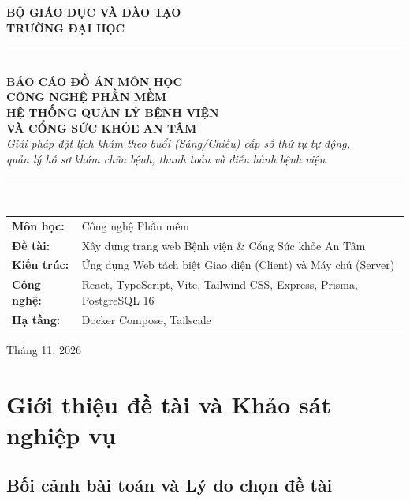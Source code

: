 \documentclass[12pt,a4paper]{report}
\begin{document}
\begin{titlepage}
  \centering
  \vspace*{0.8cm}
  {\large\bfseries BỘ GIÁO DỤC VÀ ĐÀO TẠO \\[4pt]
  TRƯỜNG ĐẠI HỌC \dotfill} \\[1.2cm]

  \rule{\textwidth}{1.5pt} \\[0.6cm]
  {\large\bfseries\color{antamNavy} BÁO CÁO ĐỒ ÁN MÔN HỌC \\[4pt] CÔNG NGHỆ PHẦN MỀM} \\[0.8cm]
  {\Huge\bfseries\color{antamNavy} HỆ THỐNG QUẢN LÝ BỆNH VIỆN \\ VÀ CỔNG SỨC KHỎE AN TÂM} \\[0.5cm]
  {\normalsize\itshape Giải pháp đặt lịch khám theo buổi (Sáng/Chiều) cấp số thứ tự tự động, \\ quản lý hồ sơ khám chữa bệnh, thanh toán và điều hành bệnh viện} \\[0.6cm]
  \rule{\textwidth}{1.5pt} \\[1.8cm]

  \begin{tabular}{@{}ll@{}}
    \textbf{Môn học:} & Công nghệ Phần mềm \\
    \textbf{Đề tài:} & Xây dựng trang web Bệnh viện \& Cổng Sức khỏe An Tâm \\
    \textbf{Kiến trúc:} & Ứng dụng Web tách biệt Giao diện (Client) và Máy chủ (Server) \\
    \textbf{Công nghệ:} & React, TypeScript, Vite, Tailwind CSS, Express, Prisma, PostgreSQL 16 \\
    \textbf{Hạ tầng:} & Docker Compose, Tailscale
  \end{tabular}

  \vfill
  {\normalsize Tháng 11, 2026}
\end{titlepage}

\tableofcontents
\clearpage
\listoffigures
\clearpage
\listoftables
\clearpage


\chapter{Giới thiệu đề tài và Khảo sát nghiệp vụ}

\section{Bối cảnh bài toán và Lý do chọn đề tài}
\end{document}

